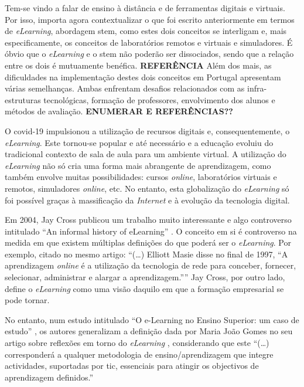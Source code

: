 
Tem-se vindo a falar de ensino à distância e de ferramentas digitais e virtuais. Por isso, importa agora contextualizar o que foi escrito anteriormente em termos de \textit{eLearning}, abordagem \acrshort{stem}, como estes dois conceitos se interligam e, mais especificamente, os conceitos de laboratórios remotos e virtuais e simuladores.
É óbvio que o \textit{eLearning} e o \acrshort{stem} não poderão ser dissociados, sendo que a relação entre os dois é mutuamente benéfica. \textbf{REFERÊNCIA} Além dos mais, as dificuldades na implementação destes dois conceitos em Portugal apresentam várias semelhanças. Ambas enfrentam desafios relacionados com as infra-estruturas tecnológicas, formação de professores, envolvimento dos alunos e métodos de avaliação. \textbf{ENUMERAR E REFERÊNCIAS??}

O \acrshort{covid-19} impulsionou a utilização de recursos digitais e, consequentemente, o \textit{eLearning}. Este tornou-se popular e até necessário e a educação evoluiu do tradicional contexto de sala de aula para um ambiente virtual. 
A utilização do \textit{eLearning} não só cria uma forma mais abrangente de aprendizagem, como também envolve muitas possibilidades: cursos \textit{online}, laboratórios virtuais e remotos, simuladores \textit{online}, etc.
No entanto, esta globalização do \textit{eLearning} só foi possível graças à massificação da \textit{Internet} e à evolução da tecnologia digital.

Em 2004, Jay Cross publicou um trabalho muito interessante e algo controverso intitulado ``An informal history of eLearning'' \cite{jaycross}. O conceito em si é controverso na medida em que existem múltiplas definições do que poderá ser o \textit{eLearning}. Por exemplo, citado no mesmo artigo: ``(\ldots) Elliott Masie disse no final de 1997, ``A aprendizagem \textit{online} é a utilização da tecnologia de rede para conceber, fornecer, selecionar, administrar e alargar a aprendizagem.'''' Jay Cross, por outro lado, define o \textit{eLearning} como uma visão daquilo em que a formação empresarial se pode tornar. 

No entanto, num estudo intitulado ``O e-Learning no Ensino Superior: um caso de estudo'' \cite{eLearningenssup}, os autores generalizam a definição dada por Maria João Gomes no seu artigo sobre reflexões em torno do \textit{eLearning} \cite{gomes_e-learning_2005}, considerando que este ``(\ldots) corresponderá a qualquer metodologia de ensino/aprendizagem que integre actividades, suportadas por \acrshort{tic}, essenciais para atingir os objectivos de aprendizagem definidos.''

